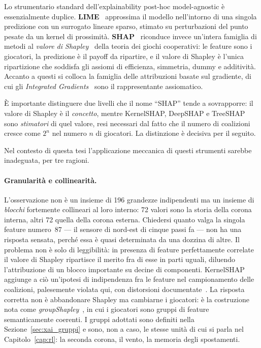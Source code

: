Lo strumentario standard dell'explainability post-hoc model-agnostic \`e essenzialmente
duplice. \textbf{LIME}~\cite{lime} approssima il modello nell'intorno di una singola
predizione con un surrogato lineare sparso, stimato su perturbazioni del punto pesate
da un kernel di prossimit\`a. \textbf{SHAP}~\cite{shap} riconduce invece un'intera
famiglia di metodi al \emph{valore di Shapley}~\cite{shapley1953} della teoria dei
giochi cooperativi: le feature sono i giocatori, la predizione \`e il payoff da
ripartire, e il valore di Shapley \`e l'unica ripartizione che soddisfa gli assiomi di
efficienza, simmetria, dummy e additivit\`a. Accanto a questi si colloca la famiglia
delle attribuzioni basate sul gradiente, di cui gli \emph{Integrated
Gradients}~\cite{integrated_gradients} sono il rappresentante assiomatico.

\`E importante distinguere due livelli che il nome ``SHAP'' tende a sovrapporre: il
valore di Shapley \`e il \emph{concetto}, mentre KernelSHAP, DeepSHAP e TreeSHAP sono
\emph{stimatori} di quel valore, resi necessari dal fatto che il numero di coalizioni
cresce come $2^n$ nel numero $n$ di giocatori. La distinzione \`e decisiva per il
seguito.

Nel contesto di questa tesi l'applicazione meccanica di questi strumenti sarebbe
inadeguata, per tre ragioni.

\paragraph{Granularit\`a e collinearit\`a.} L'osservazione non \`e un insieme di 196
grandezze indipendenti ma un insieme di \emph{blocchi} fortemente collineari al loro
interno: 72 valori sono la storia della corona interna, altri 72 quella della corona
esterna. Chiedersi quanto valga la singola feature numero~87 --- il sensore di
nord-est di cinque passi fa --- non ha una risposta sensata, perch\'e essa \`e quasi
determinata da una dozzina di altre. Il problema non \`e solo di leggibilit\`a: in
presenza di feature perfettamente correlate il valore di Shapley ripartisce il merito
fra di esse in parti uguali, diluendo l'attribuzione di un blocco importante su decine
di componenti. KernelSHAP aggiunge a ci\`o un'ipotesi di indipendenza fra le feature nel
campionamento delle coalizioni, palesemente violata qui, con distorsioni
documentate~\cite{aas2021}. La risposta corretta non \`e abbandonare Shapley ma
cambiarne i giocatori: \`e la costruzione nota come
\emph{groupShapley}~\cite{groupshapley}, in cui i giocatori sono gruppi di feature
semanticamente coerenti. I gruppi adottati sono definiti nella
Sezione~\ref{sec:xai_gruppi} e sono, non a caso, le stesse unit\`a di cui si parla nel
Capitolo~\ref{cap:rl}: la seconda corona, il vento, la memoria degli spostamenti.

